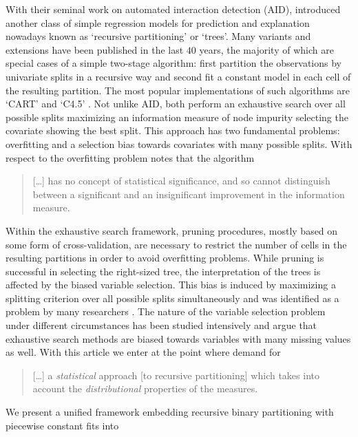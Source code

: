 With their seminal work on automated interaction detection (AID),
\cite{MorganSonquist1963} introduced another class of simple  
regression models for prediction and explanation 
nowadays known as `recursive partitioning' or `trees'.
Many variants and extensions have been published in the last $40$
years, the majority of which are special cases of a simple two-stage 
algorithm: 
first partition the observations by univariate splits in a recursive way and 
second fit a constant model in each cell of the resulting partition. 
The most popular implementations of such algorithms are `CART' 
\citep{classifica:1984} and `C4.5' \citep{Quinlan1993}. Not unlike AID, 
both perform an exhaustive search over all possible splits maximizing an
information measure of node impurity selecting the 
covariate showing the best split.
This approach has two fundamental problems: overfitting and a selection 
bias towards covariates with many possible splits. 
With respect to the 
overfitting problem \cite{Mingers1987} notes that the algorithm
\begin{quote}
[\ldots] has no concept of statistical significance, and so cannot
distinguish between a significant and an insignificant improvement in the
information measure.
\end{quote}
Within the exhaustive search framework, pruning procedures, 
mostly based on some form of cross-validation, 
are necessary to restrict the number of cells in the resulting partitions in
order to avoid overfitting problems. 
While pruning is successful in selecting the right-sized tree, the
interpretation of the trees is affected by the biased variable selection.  
This bias is induced by maximizing a splitting criterion over all
possible splits simultaneously and was identified as a problem by many
researchers \citep[e.g.,][p.~42]{Kass1980,regression:1988,classifica:1984}. 
The nature of the variable selection problem under different circumstances
has been studied intensively \citep{WhiteLiu1994,JensenCohen2000,Shih2004}
and \cite{classifica:2001} argue that exhaustive search methods are
biased towards variables with many missing values as well. 
With this article we enter at the point where \cite{WhiteLiu1994} demand for 
\begin{quote}
[\ldots] a \textit{statistical} approach [to recursive partitioning] which takes
into account the \textit{distributional} properties of the measures.
\end{quote} 
We present a unified framework embedding recursive binary partitioning with
piecewise constant fits into 
